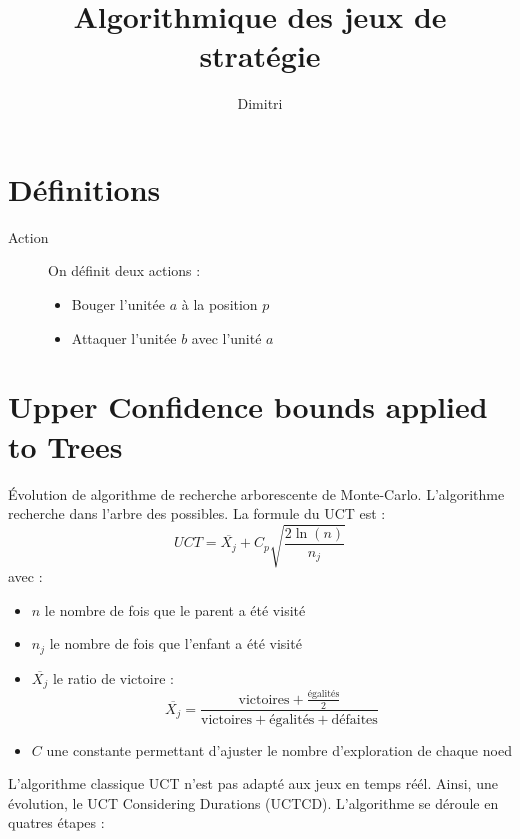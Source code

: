 \documentclass[a4paper, 11pt]{article}
\theoremstyle{definition}
\begin{document}
\title{Algorithmique des jeux de stratégie}
\author{Dimitri }

\section*{Définitions}
\begin{description}
    \item[Action] On définit deux actions : 
    \begin{itemize}
        \item Bouger l'unitée $a$ à la position $p$
        \item Attaquer l'unitée $b$ avec l'unité $a$
    \end{itemize} 
\end{description}

\section{Upper Confidence bounds applied to Trees}
Évolution de algorithme de recherche arborescente de Monte-Carlo.
L'algorithme recherche dans l'arbre des possibles. La formule du UCT est :
$$UCT = \overline{X_j} + C_p \sqrt{\frac{2 \ln(n)}{n_j}} $$ 
avec :
\begin{itemize}
    \item $n$ le nombre de fois que le parent a été visité
    \item $n_j$ le nombre de fois que l'enfant a été visité
    \item $\overline{X_j}$ le ratio de victoire : $$\overline{X_j} = \frac{\text{victoires} + \frac{\text{égalités}}{2}}{\text{victoires} + \text{égalités} + \text{défaites}}$$
    \item $C$ une constante permettant d'ajuster le nombre d'exploration de chaque noed
\end{itemize}
L'algorithme classique UCT n'est pas adapté aux jeux en temps réél. Ainsi, une évolution,
le UCT Considering Durations (UCTCD). 
L'algorithme se déroule en quatres étapes :
\\ 
\end{document}
